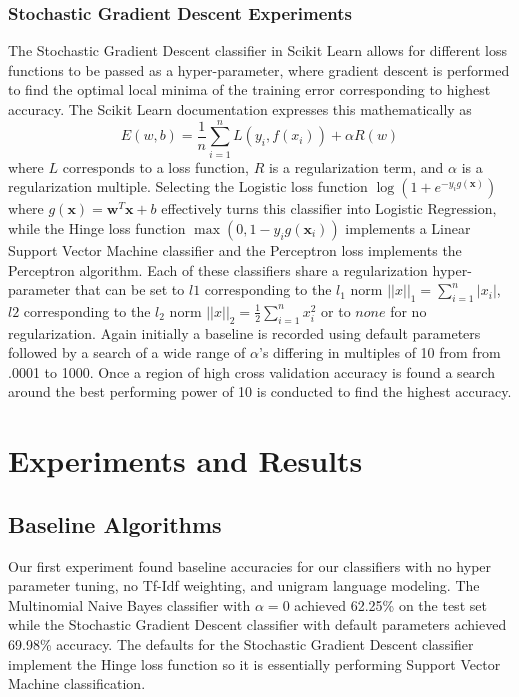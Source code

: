 \documentclass[a4paper, 12pt]{article}
\begin{document}
\subsubsection{Stochastic Gradient Descent Experiments}
The Stochastic Gradient Descent classifier in Scikit Learn allows for different loss functions to be passed as a hyper-parameter, where gradient descent is performed to find the optimal local minima of the training error corresponding to highest accuracy. The Scikit Learn documentation \cite{pedregosa2011scikit} expresses this mathematically as 
\[E(w,b)=\frac{1}{n}\sum_{i=1}^{n}L(y_i,f(x_i))+\alpha R(w)\]
where $L$ corresponds to a loss function, $R$ is a regularization term, and $\alpha$ is a regularization multiple. Selecting the Logistic loss function $\log(1+e^{-y_ig(\bm{x})})$ where $g(\bm{x})=\bm{w}^T\bm{x}+b$ effectively turns this classifier into Logistic Regression, while the Hinge loss function  $\max(0, 1 - y_ig(\bm{x}_i))$ implements a Linear Support Vector Machine classifier and the Perceptron loss implements the Perceptron algorithm.  Each of these classifiers share a regularization hyper-parameter that can be set to $l1$ corresponding to the $l_1$ norm $||x||_1=\sum_{i=1}^n |x_i|$, $l2$ corresponding to the $l_2$ norm $||x||_2= \frac{1}{2} \sum_{i=1}^{n} x_i^2$ or to $none$ for no regularization. Again initially a baseline is recorded using default parameters followed by a search of a  wide range of $\alpha$'s differing in multiples of 10 from from .0001 to 1000. Once a region of high cross validation accuracy is found a search around the best performing power of 10 is conducted to find the highest accuracy.

\noindent
\section{Experiments and Results}
\subsection{Baseline Algorithms}
Our first experiment found baseline accuracies for our classifiers with no hyper parameter tuning, no Tf-Idf weighting, and unigram language modeling. The Multinomial Naive Bayes classifier with $\alpha=0$ achieved  62.25\% on the test set while the Stochastic Gradient Descent classifier with default parameters achieved 69.98\% accuracy. The defaults for the Stochastic Gradient Descent classifier implement the Hinge loss function so it is essentially performing Support Vector Machine classification.
\end{document}
